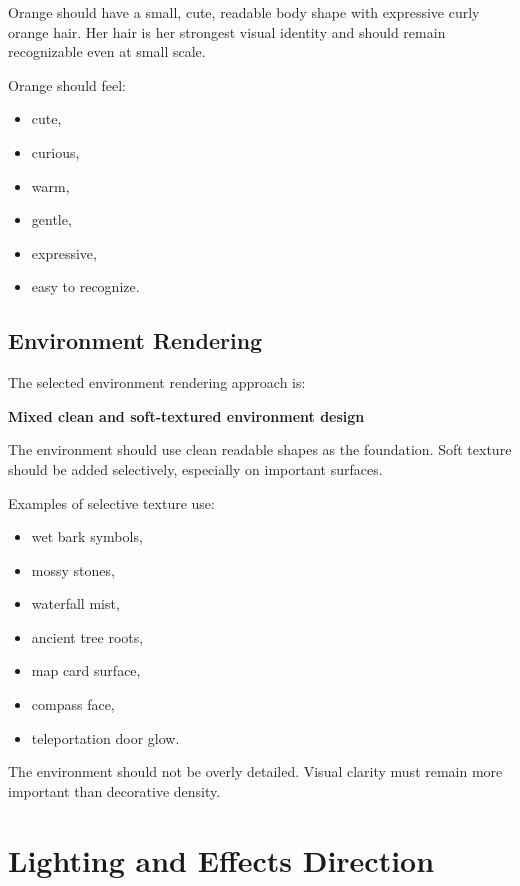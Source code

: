 \documentclass[12pt]{article}
\begin{document}
Orange should have a small, cute, readable body shape with expressive curly orange hair. Her hair is her strongest visual identity and should remain recognizable even at small scale.

Orange should feel:

\begin{itemize}[leftmargin=*]
    \item cute,
    \item curious,
    \item warm,
    \item gentle,
    \item expressive,
    \item easy to recognize.
\end{itemize}

\subsection{Environment Rendering}

The selected environment rendering approach is:

\begin{center}
\textbf{Mixed clean and soft-textured environment design}
\end{center}

The environment should use clean readable shapes as the foundation. Soft texture should be added selectively, especially on important surfaces.

Examples of selective texture use:

\begin{itemize}[leftmargin=*]
    \item wet bark symbols,
    \item mossy stones,
    \item waterfall mist,
    \item ancient tree roots,
    \item map card surface,
    \item compass face,
    \item teleportation door glow.
\end{itemize}

The environment should not be overly detailed. Visual clarity must remain more important than decorative density.

\section{Lighting and Effects Direction}
\end{document}
